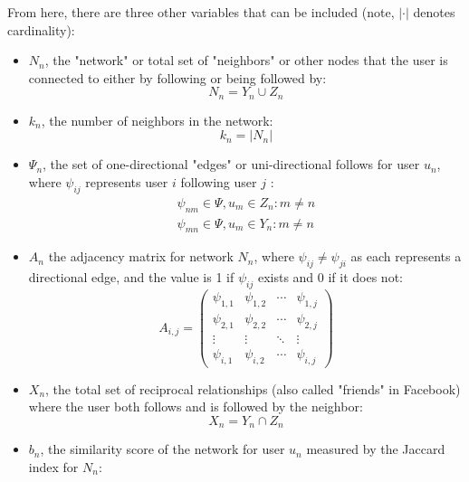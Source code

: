 \documentclass[NETN,manuscript]{stjour-new}
\begin{document}
From here, there are three other variables that can be included (note, $|\cdot|$ denotes cardinality):
\begin{itemize}
    \item $N_n$, the "network" or total set of "neighbors" or other nodes that the user is connected to either by following or being followed by: 
    \begin{equation}
        N_n = Y_n \cup Z_n 
    \end{equation}
    \item $k_n$, the number of neighbors in the network: \begin{equation}
        k_n = |N_n|
    \end{equation}
    \item $\Psi_n$, the set of one-directional "edges" or uni-directional follows for user $u_n$, where $\psi_{ij}$ represents user $i$ following user $j$ :
    \begin{equation}
    \begin{split}
        \psi_{nm} \in \Psi, u_m \in Z_n: m \neq n \\
        \psi_{mn} \in \Psi, u_m \in Y_n: m \neq n 
    \end{split}
    \end{equation}
    \item $A_n$ the adjacency matrix for network $N_n$, where $\psi_{ij} \neq \psi_{ji}$ as each represents a directional edge, and the value is 1 if $\psi_{ij}$ exists and 0 if it does not:
    \begin{equation*}
A_{i,j} = 
\begin{pmatrix}
\psi_{1,1} & \psi_{1,2} & \cdots & \psi_{1,j} \\
\psi_{2,1} & \psi_{2,2} & \cdots & \psi_{2,j} \\
\vdots  & \vdots  & \ddots & \vdots  \\
\psi_{i,1} & \psi_{i,2} & \cdots & \psi_{i,j} 
\end{pmatrix}
\end{equation*}
    \item $X_n$, the total set of reciprocal relationships (also called "friends" in Facebook) where the user both follows and is followed by the neighbor:
    \begin{equation}
        X_n = Y_n \cap Z_n 
    \end{equation}
    \item $b_n$, the similarity score of the network for user $u_n$ measured by the Jaccard index for $N_n$: 
    \begin{equation}

\end{equation}
\end{itemize}
\end{document}

